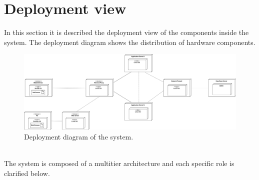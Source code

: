 \documentclass{report}
\begin{document}
\section{Deployment view}
In this section it is described the deployment view of the components inside the system. The deployment diagram shows the distribution of hardware components.
\begin{figure}[!ht]
	\begin{center}
	\includegraphics[width=.95\textwidth]{img/DeploymentView.png}
    \end{center}
    \label{fig:deploymentview}
	\caption{Deployment diagram of the system.}
\end{figure}\\
The system is composed of a multitier architecture and each specific role is clarified below.\\
\end{document}
